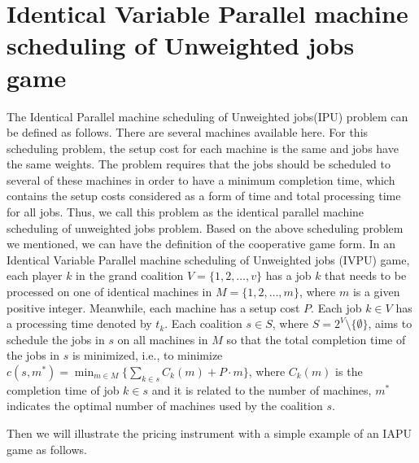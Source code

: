 \section*{Identical Variable Parallel machine scheduling of Unweighted jobs game}

The Identical Parallel machine scheduling of Unweighted jobs(IPU) problem can be defined as follows. There are several machines available here. For this scheduling problem, the setup cost for each machine is the same and jobs have the same weights. The problem requires that the jobs should be scheduled to several of these machines in order to have a minimum completion time, which contains the setup costs considered as a form of time and total processing time for all jobs. Thus, we call this problem as the
identical parallel machine scheduling of unweighted jobs problem.
Based on the above scheduling problem we mentioned, we can have the definition of the cooperative game form.
In an Identical Variable Parallel machine scheduling of Unweighted jobs (IVPU) game, each player $k$ in the grand coalition $V=\{1,2,\ldots,v\}$ has a job $k$ that needs to be processed on one of identical machines in $M=\{1,2,\ldots,m\}$, where $m$ is a given positive integer. Meanwhile, each machine has a setup cost $P$. Each job $k\in V$ has a processing time denoted by $t_k$. Each coalition $s \in S$, where $S=2^V\setminus\{\emptyset\}$, aims to schedule the jobs in $s$ on all machines in $M$ so that the total completion time of the jobs in $s$ is minimized, i.e., to minimize
$c(s,m^*) = \min_{m \in M} \{\sum_{k\in s}{C_k(m)}+ P\cdot m\}$, where $C_k(m)$ is the completion time of job $k\in s$ and it is related to the number of machines, $m^*$ indicates the optimal number of machines used by the coalition $s$.

Then we will illustrate the pricing instrument with a simple example of an IAPU game as follows.
